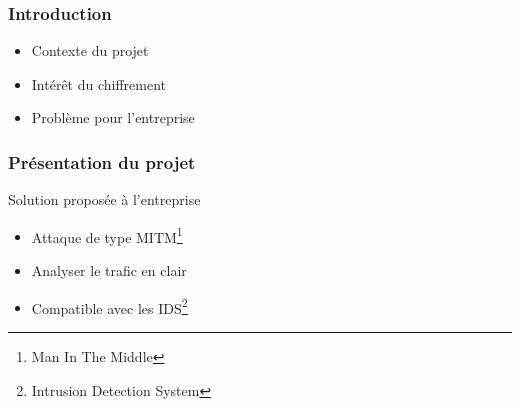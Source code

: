\begin{frame}
\frametitle{Introduction}
\begin{itemize}
\item Contexte du projet
\item Intérêt du chiffrement
\item Problème pour l'entreprise
\end{itemize}
\end{frame}


\begin{frame}
\frametitle{Présentation du projet}
Solution proposée à l'entreprise
\begin{itemize}
\item Attaque de type MITM\footnote[frame]{Man In The Middle}
\item Analyser le trafic en clair
\item Compatible avec les IDS\footnote[frame]{Intrusion Detection System}
\end{itemize}
\end{frame}